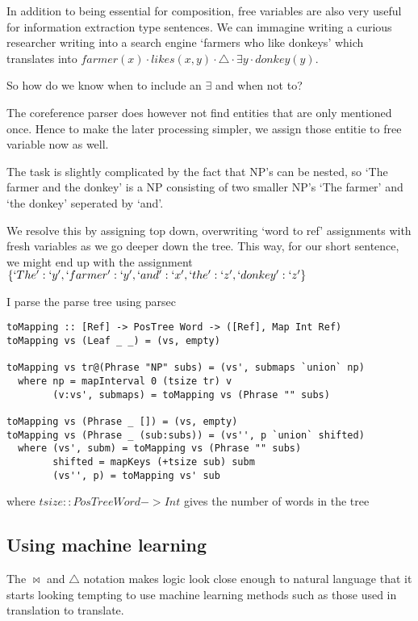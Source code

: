 \documentclass[12pt]{article}
\begin{document}
In addition to being essential for composition, free variables are also very useful for information extraction type sentences. We can immagine writing a curious researcher writing into a search engine `farmers who like donkeys' which translates into $farmer(x) \cdot likes(x,y) \cdot \triangle \cdot \exists y \cdot donkey(y)$.

So how do we know when to include an $\exists$ and when not to?

The coreference parser does however not find entities that are only mentioned once. Hence to make the later processing simpler, we assign those entitie to free variable now as well.

The task is slightly complicated by the fact that NP's can be nested, so `The farmer and the donkey' is a NP consisting of two smaller NP's `The farmer' and `the donkey' seperated by `and'.

We resolve this by assigning top down, overwriting `word to ref' assignments with fresh variables as we go deeper down the tree. This way, for our short sentence, we might end up with the assignment $\{`The': `y', `farmer': `y', `and': `x', `the': `z', `donkey': `z'\}$

I parse the parse tree using parsec\cite{leijen2001parsec}

\begin{lstlisting}
toMapping :: [Ref] -> PosTree Word -> ([Ref], Map Int Ref)
toMapping vs (Leaf _ _) = (vs, empty)

toMapping vs tr@(Phrase "NP" subs) = (vs', submaps `union` np)
  where np = mapInterval 0 (tsize tr) v
        (v:vs', submaps) = toMapping vs (Phrase "" subs)

toMapping vs (Phrase _ []) = (vs, empty)
toMapping vs (Phrase _ (sub:subs)) = (vs'', p `union` shifted)
  where (vs', subm) = toMapping vs (Phrase "" subs)
        shifted = mapKeys (+tsize sub) subm
        (vs'', p) = toMapping vs' sub
\end{lstlisting}

where $tsize :: PosTree Word -> Int$ gives the number of words in the tree

\subsection{Using machine learning}
The $\bowtie$ and $\triangle$ notation makes logic look close enough to natural language that it starts looking tempting to use machine learning methods such as those used in translation to translate.
\end{document}
